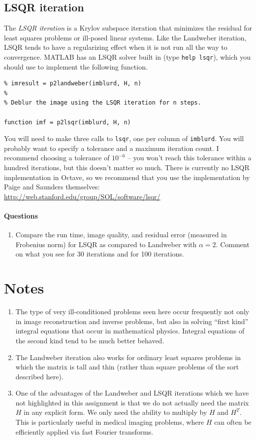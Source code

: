 \documentclass[12pt, leqno]{article} %
\begin{document}
\subsection{LSQR iteration}

The {\em LSQR iteration} is a Krylov subspace iteration that minimizes
the residual for least squares problems or ill-posed linear systems.
Like the Landweber iteration, LSQR tends to have a regularizing effect
when it is not run all the way to convergence.  MATLAB has an LSQR
solver built in (type {\tt help lsqr}), which you should use to
implement the following function.
\begin{lstlisting}
% imresult = p2landweber(imblurd, H, n)
%
% Deblur the image using the LSQR iteration for n steps.

function imf = p2lsqr(imblurd, H, n)
\end{lstlisting}
You will need to make three calls to {\tt lsqr}, one per column of
{\tt imblurd}.  You will probably want to specify a tolerance and
a maximum iteration count.  I recommend choosing a tolerance of
$10^{-6}$ -- you won't reach this tolerance within a hundred
iterations, but this doesn't matter so much. There is currently no
LSQR implementation in Octave, so we recommend that you use
the implementation by Paige and Saunders themselves:
\url{http://web.stanford.edu/group/SOL/software/lsqr/}

\paragraph*{Questions}

\begin{enumerate}
\item
  Compare the run time, image quality, and residual error (measured in
  Frobenius norm) for LSQR as compared to Landweber with $\alpha = 2$.
  Comment on what you see for 30 iterations and for 100 iterations.
\end{enumerate}

\section{Notes}

\begin{enumerate}
\item
  The type of very ill-conditioned problems seen here occur frequently
  not only in image reconstruction and inverse problems, but also in
  solving ``first kind'' integral equations that occur in mathematical
  physics.  Integral equations of the second kind tend to be much
  better behaved.
\item
  The Landweber iteration also works for ordinary least squares
  problems in which the matrix is tall and thin (rather than
  square problems of the sort described here).
\item
  One of the advantages of the Landweber and LSQR iterations which we have
  not highlighted in this assignment is that we do not actually need
  the matrix $H$ in any explicit form.  We only need the ability to
  multiply by $H$ and $H^T$.  This is particularly useful in medical
  imaging problems, where $H$ can often be efficiently applied via
  fast Fourier transforms.
\end{enumerate}
\end{document}
